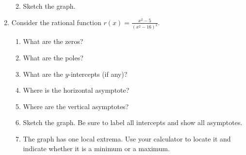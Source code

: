 \documentclass[letterpaper,12pt,fleqn]{article}
\begin{document}
\begin{enumerate}
\begin{enumerate}
    \vspace{1in}

  \item Sketch the graph.

    \bigskip

    \begin{figure}[h]
      \setlength{\leftskip}{1in}
    \end{figure}
  \end{enumerate}

  \newpage

\item Consider the rational function $r(x)=\frac{x^2-5}{(x^2-16)^2}$.
  \begin{enumerate}
  \item What are the zeros?

    \vspace{0.5in}
    
  \item What are the poles?

    \vspace{0.5in}

  \item What are the $y$-intercepts (if any)?

    \vspace{1in}

  \item Where is the horizontal asymptote?

    \vspace{0.5in}

  \item Where are the vertical asymptotes?

    \vspace{0.5in}

  \item Sketch the graph. Be sure to label all intercepts and show all
    asymptotes.

    \bigskip

    \begin{figure}[h]
      \setlength{\leftskip}{1in}
    \end{figure}
    
  \item The graph has one local extrema. Use your calculator to locate it and
    indicate whether it is a minimum or a maximum.
  \end{enumerate}
\end{enumerate}
\end{document}
